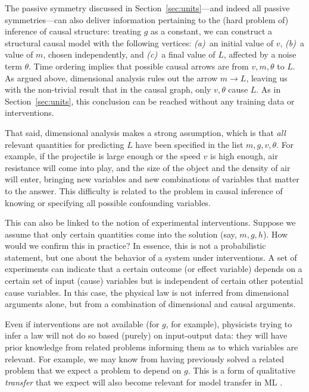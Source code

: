 \documentclass{article} %
\newcommand{\sectionname}{Section}
\newcommand{\secref}[1]{\sectionname~\ref{#1}}
\begin{document}
The passive symmetry discussed in \secref{sec:units}---and indeed all passive symmetries---can also deliver information pertaining to the (hard problem of) inference of causal structure:
treating $g$ as a constant, we can construct a structural causal model with the following vertices: \textsl{(a)}~an initial value of $v$, \textsl{(b)}~a value of $m$, chosen independently, and \textsl{(c)}~a final value of $L$, affected by a noise term $\theta$.
Time ordering implies that possible causal arrows are from $v, m, \theta$ to $L$.
As argued above, dimensional analysis rules out the arrow $m\to L$, leaving us with the non-trivial result that in the causal graph, only $v,\theta$ cause $L$.
As in \secref{sec:units}, this conclusion can be reached without any training data or interventions.

That said, dimensional analysis makes a strong assumption, which is that \emph{all} relevant quantities for predicting $L$ have been specified in the list $m, g, v, \theta$.
For example, if the projectile is large enough or the speed $v$ is high enough, air resistance will come into play, and the size of the object and the density of air will enter, bringing new variables and new combinations of variables that matter to the answer.
This difficulty is related to the problem in causal inference of knowing or specifying all possible confounding variables.

This can also be linked to the notion of experimental interventions. Suppose we assume that only certain quantities come into the solution (say, $m, g, h$). How would we confirm this in practice? In essence, this is not a probabilistic statement, but one about the behavior of a system under interventions. A set of experiments can indicate that a certain outcome (or effect variable) depends on a certain set of input (cause) variables but is independent of certain other potential cause variables. In this case, the physical law is not inferred from dimensional arguments alone, but from a combination of dimensional and causal arguments.

Even if interventions are not available (for $g$, for example), physicists trying to infer a law will not do so based (purely) on input-output data: they will have prior knowledge from related problems informing them as to which variables are relevant. For example, we may know from having previously solved a related problem that we expect a problem to depend on $g$.
This is a form of qualitative \emph{transfer} that we expect will also become relevant for model transfer in ML \citep{RojSchTurPet18}.
\end{document}
